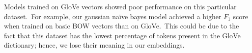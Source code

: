 \documentclass[12pt,a4paper]{article}
\begin{document}
Models trained on GloVe vectors showed poor performance on this particular dataset.\ For example, our gaussian na\"{i}ve bayes model achieved a higher $F_1$ score when trained on basic BOW vectors than on GloVe.\ This could be due to the fact that this dataset has the lowest percentage of tokens present in the GloVe dictionary; hence, we lose their meaning in our embeddings.\\\vspace{-15pt}






\end{document}
